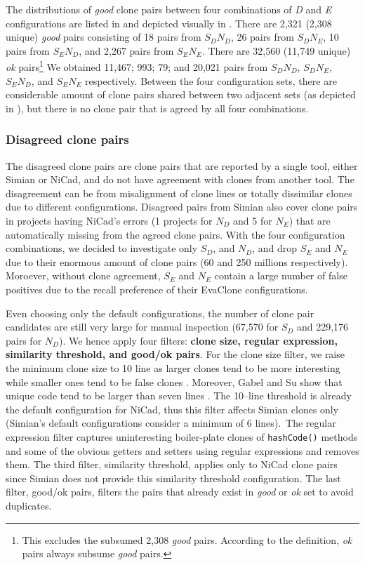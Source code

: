 \documentclass[sigconf,review, anonymous]{acmart}
\begin{document}
The distributions of \textit{good} clone pairs between four combinations of \textit{D} and \textit{E} configurations are listed in  and depicted visually in . There are 2,321 (2,308 unique) \textit{good} pairs consisting of 18 pairs from $S_DN_D$, 26 pairs from $S_DN_E$, 10 pairs from $S_EN_D$, and 2,267 pairs from $S_EN_E$. There are 32,560 (11,749 unique) \textit{ok} pairs\footnote{This excludes the subsumed 2,308 \textit{good} pairs. According to the definition, \textit{ok} pairs always subsume \textit{good} pairs.} We obtained 11,467; 993; 79; and 20,021 pairs from $S_DN_D$, $S_DN_E$, $S_EN_D$, and $S_EN_E$ respectively. Between the four configuration sets, there are considerable amount of clone pairs shared between two adjacent sets (as depicted in ), but there is no clone pair that is agreed by all four combinations. 

\subsubsection{Disagreed clone pairs}

The disagreed clone pairs are clone pairs that are reported by a single tool, either Simian or NiCad, and do not have agreement with clones from another tool. The disagreement can be from misalignment of clone lines or totally dissimilar clones due to different configurations. Disagreed pairs from Simian also cover clone pairs in projects having NiCad's errors (1 projects for $N_D$ and 5 for $N_E$) that are automatically missing from the agreed clone pairs. With the four configuration combinations, we decided to investigate only $S_D$, and $N_D$, and drop $S_E$ and $N_E$ due to their enormous amount of clone pairs (60 and 250 millions respectively). Moroever, without clone agreement, $S_E$ and $N_E$ contain a large number of false positives due to the recall preference of their EvaClone configurations. 

Even choosing only the default configurations, the number of clone pair candidates are still very large for manual inspection (67,570 for $S_D$ and 229,176 pairs for $N_D$). We hence apply four filters: \textbf{clone size, regular expression, similarity threshold, and good/ok pairs}. For the clone size filter, we raise the minimum clone size to 10 line as larger clones tend to be more interesting while smaller ones tend to be false clones \cite{Saini2016}. Moreover, Gabel and Su show that unique code tend to be larger than seven lines \cite{Gabel2010}. The 10--line threshold is already the default configuration for NiCad, thus this filter affects Simian clones only (Simian's default configurations consider a minimum of 6 lines).~The regular expression filter captures uninteresting boiler-plate clones of \verb|hashCode()| methods and some of the obvious getters and setters using regular expressions and removes them. The third filter, similarity threshold, applies only to NiCad clone pairs since Simian does not provide this similarity threshold configuration. The last filter, good/ok pairs, filters the pairs that already exist in \textit{good} or \textit{ok} set to avoid duplicates. 
\end{document}
